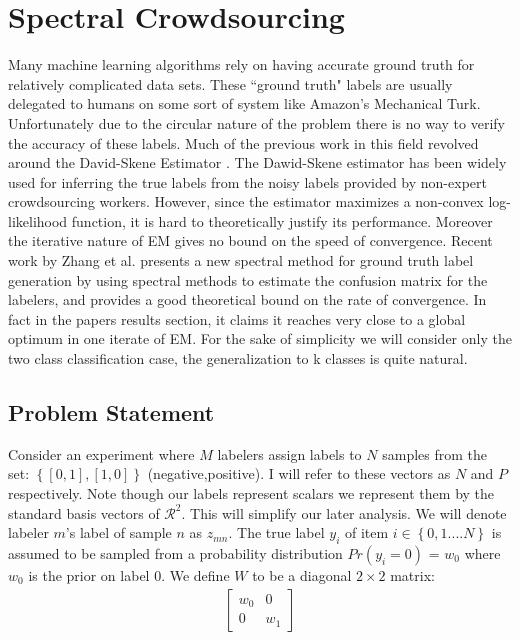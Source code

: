 \documentclass{article}
\begin{document}
\section{Spectral Crowdsourcing}
    Many machine learning algorithms rely on having accurate ground truth for relatively complicated data sets. These ``ground truth" labels are usually delegated to humans on some sort of system like Amazon's Mechanical Turk. Unfortunately due to the circular nature of the problem there is no way to verify the accuracy of these labels. Much of the previous work in this field revolved around the David-Skene Estimator \cite{dawid1979maximum}. The Dawid-Skene estimator has been widely used for inferring the true labels from the noisy labels provided by non-expert crowdsourcing workers. However, since the estimator maximizes a non-convex log-likelihood function, it is hard to theoretically justify its performance. Moreover the iterative nature of EM gives no bound on the speed of convergence.  Recent work by Zhang et al. \cite{zhang2014spectral} presents a new spectral method for ground truth label generation by using spectral methods to estimate the confusion matrix for the labelers, and provides a good theoretical bound on the rate of convergence. In fact in the papers results section, it claims it reaches very close to a global optimum in one iterate of EM. For the sake of simplicity we will consider only the two class classification case, the generalization to k classes is quite natural.

\subsection{Problem Statement}
Consider an experiment where $M$ labelers assign labels to $N$ samples from the set: $\left\{[0,1],[1,0]\right\}$ (negative,positive). I will refer to these vectors as $N$ and $P$ respectively. Note though our labels represent scalars we represent them by the standard basis vectors of $\mathcal{R}^{2}$. This will simplify our later analysis. We will denote labeler $m$'s label of sample $n$ as $z_{mn}$. The true label $y_{i}$ of item
$i \in \left\{0,1....N\right\} $ is assumed to be sampled from a probability
distribution $Pr(y_{i} = 0)$ = $w_{0}$ where $w_{0}$ is the prior on label 0.  We define $W$ to be a diagonal $2 \times 2$ matrix:
\begin{align}
\begin{bmatrix}
w_{0} & 0 \\
0     & w_{1}
\end{bmatrix}
\end{align}
\end{document}
